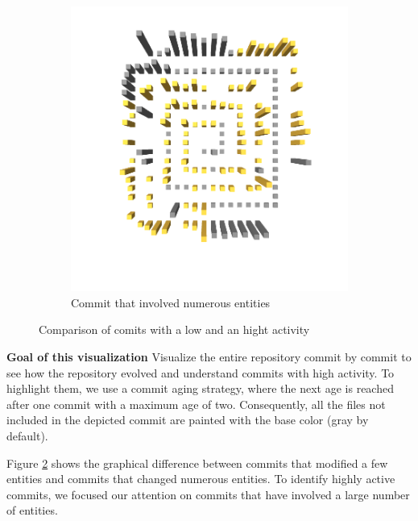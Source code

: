 \begin{figure}[t!]
\begin{subfigure}{0.42\textwidth}
        \includegraphics[width=\linewidth]{JetUML_V0E1.png}
        \caption{Commit that involved numerous entities} \label{fig:JetUML_V0E1}
    \end{subfigure}
    \caption{Comparison of comits with a low and an hight activity} 
    \label{fig:JetUML_V0E0}
\end{figure}

\textbf{Goal of this visualization} Visualize the entire repository commit by commit to see how the repository evolved and understand commits with high activity. 
To highlight them, we use a commit aging strategy, where the next age is reached after one commit with a maximum age of two.
Consequently, all the files not included in the depicted commit are painted with the base color (gray by default). 

Figure \ref{fig:JetUML_V0E0} shows the graphical difference between commits that modified a few entities and commits that changed numerous entities. 
To identify highly active commits, we focused our attention on commits that have involved a large number of entities. 

